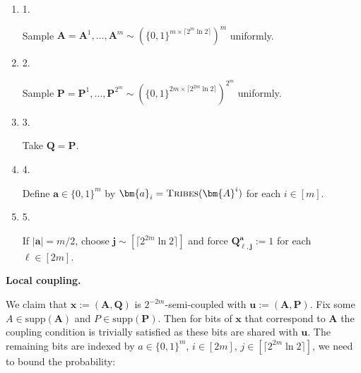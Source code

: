 \begin{enumerate}


\item[] 
1. 


Sample $\bm{A}=\bm{A}^{1},\dots,\bm{A}^{m}\sim(\{0,1\}^{m\times\lceil 2^{m}\ln 2\rceil})^{m}$ uniformly.\par





\item[] 
2. 


Sample $\bm{P}=\bm{P}^{1},\dots,\bm{P}^{2^{m}}\sim(\{0,1\}^{2m\times\lceil 2^{2m}\ln 2\rceil})^{2^{m}}$ uniformly.\par





\item[] 
3. 


Take $\bm{Q}=\bm{P}$.\par





\item[] 
4. 


Define $\bm{a}\in\{0,1\}^{m}$ by $\bm{a}_{i}=\textsc{Tribes}(\bm{A}^{i})$ for each $i\in[m]$.\par





\item[] 
5. 


If $|\bm{a}|=m/2$, choose $\bm{j}\sim[\lceil 2^{2m}\ln 2\rceil]$ and force $\bm{Q}^{\bm{a}}_{\ell,\bm{j}}:=1$ for each $\ell\in[2m]$.\par





\end{enumerate}





\par\medskip\noindent\textbf{Local coupling.}\par




We claim that $\bm{x}:=(\bm{A},\bm{Q})$ is $2^{-2m}$-semi-coupled with $\bm{u}:=(\bm{A},\bm{P})$.
Fix some $A\in\mathrm{supp}(\bm{A})$ and $P\in\mathrm{supp}(\bm{P})$. Then for bits of $\bm{x}$ that correspond to $\bm{A}$ the coupling condition is trivially satisfied as these bits are shared with $\bm{u}$. The remaining bits are indexed by $a\in\{0,1\}^{m}$, $i\in[2m]$, $j\in[\lceil 2^{2m}\ln 2\rceil]$, we need to bound the probability:\par


